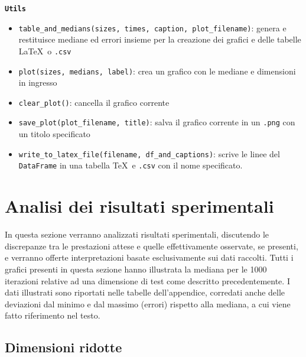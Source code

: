 \documentclass[onecolumn]{article}
\begin{document}
\newpage
{\setlength{\parindent}{0em} \texttt{\textbf{Utils}}}
\begin{itemize}
	\setlength\itemsep{0em}
	\item \verb|table_and_medians(sizes, times, caption, plot_filename)|: genera e restituisce mediane ed errori insieme per la creazione dei grafici e delle tabelle \LaTeX\ o \verb|.csv|
	\item \verb|plot(sizes, medians, label)|: crea un grafico con le mediane e dimensioni in ingresso
	\item \verb|clear_plot()|: cancella il grafico corrente
	\item \verb|save_plot(plot_filename, title)|: salva il grafico corrente in un \verb|.png| con un titolo specificato
	\item \verb|write_to_latex_file(filename, df_and_captions)|: scrive le linee del \verb|DataFrame| in una tabella \TeX\ e \verb|.csv| con il nome specificato.
\end{itemize}

\newpage
\section{Analisi dei risultati sperimentali}

In questa sezione verranno analizzati risultati sperimentali, discutendo le discrepanze tra le prestazioni attese e quelle effettivamente osservate, se presenti, e verranno offerte interpretazioni basate esclusivamente sui dati raccolti. Tutti i grafici presenti in questa sezione hanno illustrata la mediana per le 1000 iterazioni relative ad una dimensione di test come descritto precedentemente. I dati illustrati sono riportati nelle tabelle dell'appendice, corredati anche delle deviazioni dal minimo e dal massimo (errori) rispetto alla mediana, a cui viene fatto riferimento nel testo.

\subsection{Dimensioni ridotte}
\end{document}
